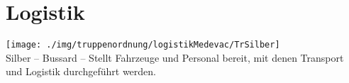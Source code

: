 \section{Logistik}
\texttt{[image: ./img/truppenordnung/logistikMedevac/TrSilber]}\\
Silber -- Bussard -- Stellt Fahrzeuge und Personal bereit, mit denen Transport und Logistik durchgeführt werden.
